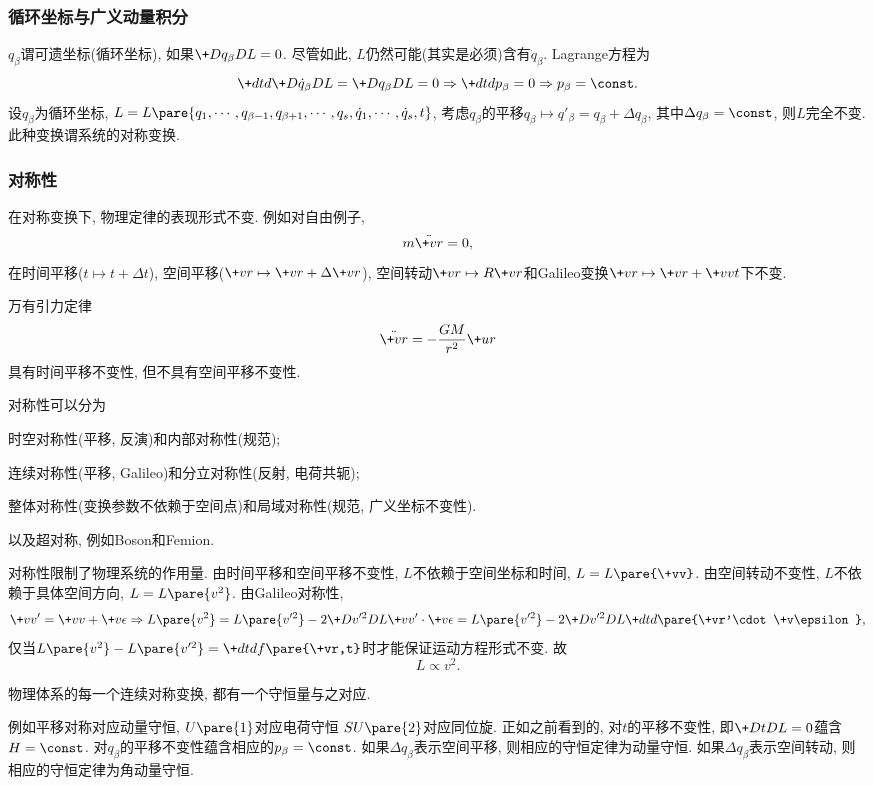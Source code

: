 \documentclass{ctexart}
\begin{document}
\subsubsection{循环坐标与广义动量积分} %
\label{ssub:循环坐标与广义动量积分}

$q_\beta$谓可遗坐标(循环坐标), 如果$\+D{q_\beta}DL = 0$. 尽管如此, $L$仍然可能(其实是必须)含有$\dot{q}_\beta$. Lagrange方程为
\[ \+dtd{} \+D{\dot{q}_\beta}DL = \+D{q_\beta}DL = 0\Rightarrow \+dtd{} p_\beta = 0 \Rightarrow p_\beta = \const. \]
设$q_\beta$为循环坐标, $L = L\pare{q_1,\cdots,q_{\beta-1},q_{\beta+1},\cdots,q_s,\dot{q}_1,\cdots,\dot{q}_s,t}$, 考虑$q_\beta$的平移$q_\beta \mapsto q'_\beta = q_\beta + \Delta q_\beta$, 其中$\Delta q_\beta = \const$, 则$L$完全不变. 此种变换谓系统的对称变换.


\subsubsection{对称性} %
\label{ssub:对称性}

在对称变换下, 物理定律的表现形式不变. 例如对自由例子,
\[ m\ddot{\+vr} = 0, \]
在时间平移($t\mapsto t+\Delta t$), 空间平移($\+vr \mapsto \+vr + \Delta \+vr$), 空间转动$\+vr \mapsto R\+vr$和Galileo变换$\+vr \mapsto \+vr + \+vv t$下不变.
\par
万有引力定律
\[ \ddot{\+vr} = -\frac{GM}{r^2}\+ur \]
具有时间平移不变性, 但不具有空间平移不变性.
\par
对称性可以分为
\begin{cenum}
    \item 时空对称性(平移, 反演)和内部对称性(规范);
    \item 连续对称性(平移, Galileo)和分立对称性(反射, 电荷共轭);
    \item 整体对称性(变换参数不依赖于空间点)和局域对称性(规范, 广义坐标不变性).
\end{cenum}
以及超对称, 例如Boson和Femion.
\par
对称性限制了物理系统的作用量. 由时间平移和空间平移不变性, $L$不依赖于空间坐标和时间, $L = L\pare{\+vv}$. 由空间转动不变性, $L$不依赖于具体空间方向, $L=L\pare{v^2}$. 由Galileo对称性,
\[ \+vv' = \+vv + \+v\epsilon \Rightarrow L\pare{v^2} = L\pare{v'^2} - 2\+D{v'^2}DL \+vv'\cdot\+v\epsilon = L\pare{v'^2} - 2\+D{v'^2}D{L}\+dtd{}\pare{\+vr'\cdot\+v\epsilon}, \]
仅当$L\pare{v^2} - L\pare{v'^2} = \displaystyle \+dtd{} f\pare{\+vr,t}$时才能保证运动方程形式不变. 故
\[ L\propto v^2. \]
\begin{theorem}[Noether定理]
    物理体系的每一个连续对称变换, 都有一个守恒量与之对应.
\end{theorem}
例如平移对称对应动量守恒, $U\pare{1}$对应电荷守恒 $SU\pare{2}$对应同位旋. 正如之前看到的, 对$t$的平移不变性, 即$\displaystyle \+DtDL = 0$蕴含$H = \const$. 对$q_\beta$的平移不变性蕴含相应的$p_\beta = \const$. 如果$\Delta q_\beta$表示空间平移, 则相应的守恒定律为动量守恒. 如果$\Delta q_\beta$表示空间转动, 则相应的守恒定律为角动量守恒.
\end{document}
